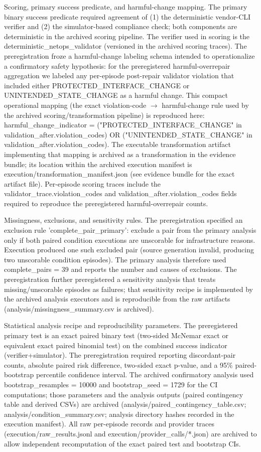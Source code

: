 \documentclass[conference]{IEEEtran}
\begin{document}
Scoring, primary success predicate, and harmful-change mapping. The primary binary success predicate required agreement of (1) the deterministic vendor-CLI verifier and (2) the simulator-based compliance check; both components are deterministic in the archived scoring pipeline. The verifier used in scoring is the deterministic\_netops\_validator (versioned in the archived scoring traces). The preregistration froze a harmful-change labeling schema intended to operationalize a confirmatory safety hypothesis: for the preregistered harmful-overrepair aggregation we labeled any per-episode post-repair validator violation that included either PROTECTED\_INTERFACE\_CHANGE or UNINTENDED\_STATE\_CHANGE as a harmful change. This compact operational mapping (the exact violation-code \ensuremath{\rightarrow} harmful-change rule used by the archived scoring/transformation pipeline) is reproduced here: harmful\_change\_indicator = ("PROTECTED\_INTERFACE\_CHANGE" in validation\_after.violation\_codes) OR ("UNINTENDED\_STATE\_CHANGE" in validation\_after.violation\_codes). The executable transformation artifact implementing that mapping is archived as a transformation in the evidence bundle; its location within the archived execution manifest is execution/transformation\_manifest.json (see evidence bundle for the exact artifact file). Per-episode scoring traces include the validator\_trace.violation\_codes and validation\_after.violation\_codes fields required to reproduce the preregistered harmful-overrepair counts.

Missingness, exclusions, and sensitivity rules. The preregistration specified an exclusion rule 'complete\_pair\_primary': exclude a pair from the primary analysis only if both paired condition executions are unscorable for infrastructure reasons. Execution produced one such excluded pair (source generation invalid, producing two unscorable condition episodes). The primary analysis therefore used complete\_pairs = 39 and reports the number and causes of exclusions. The preregistration further preregistered a sensitivity analysis that treats missing/unscorable episodes as failures; that sensitivity recipe is implemented by the archived analysis executors and is reproducible from the raw artifacts (analysis/missingness\_summary.csv is archived).

Statistical analysis recipe and reproducibility parameters. The preregistered primary test is an exact paired binary test (two-sided McNemar exact or equivalent exact paired binomial test) on the combined success indicator (verifier+simulator). The preregistration required reporting discordant-pair counts, absolute paired risk difference, two-sided exact p-value, and a 95\% paired-bootstrap percentile confidence interval. The archived confirmatory analysis used bootstrap\_resamples = 10000 and bootstrap\_seed = 1729 for the CI computations; those parameters and the analysis outputs (paired contingency table and derived CSVs) are archived (analysis/paired\_contingency\_table.csv; analysis/condition\_summary.csv; analysis directory hashes recorded in the execution manifest). All raw per-episode records and provider traces (execution/raw\_results.jsonl and execution/provider\_calls/*.json) are archived to allow independent recomputation of the exact paired test and bootstrap CIs.
\end{document}

